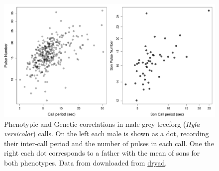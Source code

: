 \begin{figure}
\begin{center}
\includegraphics[width= \textwidth]{Journal_figs/Quant_gen/Frog_calls_Hyla_versicolor/Frog_calls_sibling_means.pdf}
\end{center}
\caption{Phenotypic and Genetic correlations in male grey treeforg
  ({\it Hyla versicolor}) calls. On the left each male is shown as a
  dot, recording their inter-call period and the number of pulses in each call. One
  the right each dot corresponds to a father with the mean of sons
  for both phenotypes. Data from \citet{welch2014multivariate} downloaded from
\href{https://datadryad.org/stash/dataset/doi:10.5061/dryad.40sj6}{dryad}, } \label{fig:Frog_genetic_corr}  
\end{figure}



